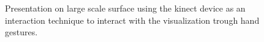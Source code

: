 \documentclass[review,journal]{vgtc}         %
\begin{document}
\begin{figure}[htb]
	\centering
	\caption{Presentation on large scale surface using the kinect device as an interaction technique to interact with the visualization trough hand gestures.}
	\label{img:dome_clip}
\end{figure}

\end{document}
